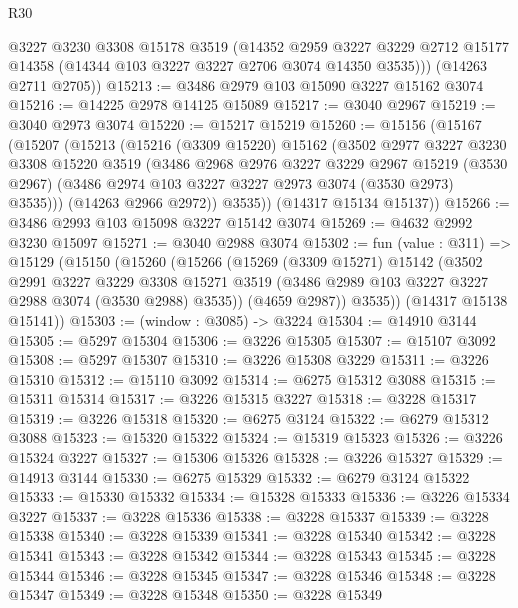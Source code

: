 \begin{lexlean}{R30}
\begin{coremodule}
        @3227
        @3230
        @3308
        @15178
        @3519
        (@14352
          @2959
          @3227
          @3229
          @2712
          @15177
          @14358
          (@14344 @103 @3227 @3227 @2706 @3074 @14350 @3535)))
      (@14263 @2711 @2705))
@15213 := @3486 @2979 @103 @15090 @3227 @15162 @3074
@15216 := @14225 @2978 @14125 @15089
@15217 := @3040 @2967
@15219 := @3040 @2973 @3074
@15220 := @15217 @15219
@15260 := @15156
    (@15167
      (@15207
        (@15213
          (@15216
            (@3309 @15220)
            @15162
            (@3502
              @2977
              @3227
              @3230
              @3308
              @15220
              @3519
              (@3486
                @2968
                @2976
                @3227
                @3229
                @2967
                @15219
                (@3530 @2967)
                (@3486 @2974 @103 @3227 @3227 @2973 @3074 (@3530 @2973) @3535)))
            (@14263 @2966 @2972))
          @3535))
      (@14317 @15134 @15137))
@15266 := @3486 @2993 @103 @15098 @3227 @15142 @3074
@15269 := @4632 @2992 @3230 @15097
@15271 := @3040 @2988 @3074
@15302 := fun (value : @311) =>
  @15129
    (@15150
      (@15260
        (@15266
          (@15269
            (@3309 @15271)
            @15142
            (@3502
              @2991
              @3227
              @3229
              @3308
              @15271
              @3519
              (@3486 @2989 @103 @3227 @3227 @2988 @3074 (@3530 @2988) @3535))
            (@4659 @2987))
          @3535))
      (@14317 @15138 @15141))
@15303 := (window : @3085) -> @3224
@15304 := @14910 @3144
@15305 := @5297 @15304
@15306 := @3226 @15305
@15307 := @15107 @3092
@15308 := @5297 @15307
@15310 := @3226 @15308 @3229
@15311 := @3226 @15310
@15312 := @15110 @3092
@15314 := @6275 @15312 @3088
@15315 := @15311 @15314
@15317 := @3226 @15315 @3227
@15318 := @3228 @15317
@15319 := @3226 @15318
@15320 := @6275 @3124
@15322 := @6279 @15312 @3088
@15323 := @15320 @15322
@15324 := @15319 @15323
@15326 := @3226 @15324 @3227
@15327 := @15306 @15326
@15328 := @3226 @15327
@15329 := @14913 @3144
@15330 := @6275 @15329
@15332 := @6279 @3124 @15322
@15333 := @15330 @15332
@15334 := @15328 @15333
@15336 := @3226 @15334 @3227
@15337 := @3228 @15336
@15338 := @3228 @15337
@15339 := @3228 @15338
@15340 := @3228 @15339
@15341 := @3228 @15340
@15342 := @3228 @15341
@15343 := @3228 @15342
@15344 := @3228 @15343
@15345 := @3228 @15344
@15346 := @3228 @15345
@15347 := @3228 @15346
@15348 := @3228 @15347
@15349 := @3228 @15348
@15350 := @3228 @15349

\end{coremodule}
\end{lexlean}

